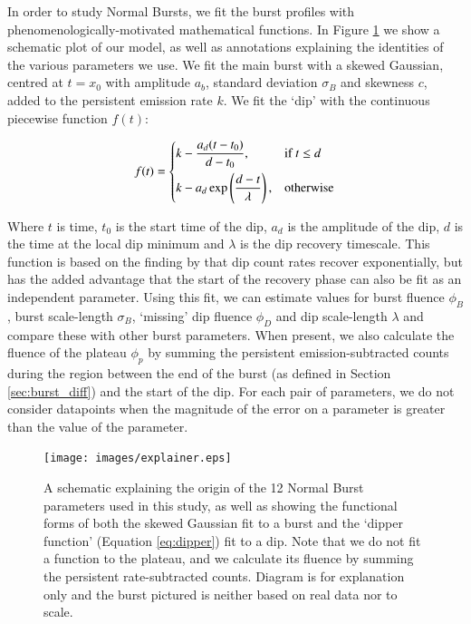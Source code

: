\par In order to study Normal Bursts, we fit the burst profiles with phenomenologically-motivated mathematical functions.  In Figure \ref{fig:explain} we show a schematic plot of our model, as well as annotations explaining the identities of the various parameters we use.  We fit the main burst with a skewed Gaussian, centred at $t=x_0$ with amplitude $a_b$, standard deviation $\sigma_B$ and skewness $c$, added to the persistent emission rate $k$.  We fit the `dip' with the continuous piecewise function $f(t)$:

\begin{equation}
f(t)=
\begin{dcases}
k-\frac{a_d(t-t_0)}{d-t_0}, & \text{if } t\leq d\\
k-a_d\exp\left(\frac{d-t}{\lambda}\right), & \text{otherwise}
\end{dcases}
\label{eq:dipper}
\end{equation}

Where $t$ is time, $t_0$ is the start time of the dip, $a_d$ is the amplitude of the dip, $d$ is the time at the local dip minimum and $\lambda$ is the dip recovery timescale.  This function is based on the finding by \citet{Younes_Expo} that dip count rates recover exponentially, but has the added advantage that the start of the recovery phase can also be fit as an independent parameter.  Using this fit, we can estimate values for burst fluence $\phi_B$, burst scale-length $\sigma_B$, `missing' dip fluence $\phi_D$ and dip scale-length $\lambda$ and compare these with other burst parameters.  When present, we also calculate the fluence of the plateau $\phi_p$ by summing the persistent emission-subtracted counts during the region between the end of the burst (as defined in Section \ref{sec:burst_diff}) and the start of the dip.  For each pair of parameters, we do not consider datapoints when the magnitude of the error on a parameter is greater than the value of the parameter.

\begin{figure}
  \centering
  \texttt{[image: images/explainer.eps]}
  \caption{\small A schematic explaining the origin of the 12 Normal Burst parameters used in this study, as well as showing the functional forms of both the skewed Gaussian fit to a burst and the `dipper function' (Equation \ref{eq:dipper}) fit to a dip.  Note that we do not fit a function to the plateau, and we calculate its fluence by summing the persistent rate-subtracted counts.  Diagram is for explanation only and the burst pictured is neither based on real data nor to scale.}
  \label{fig:explain}
\end{figure}

